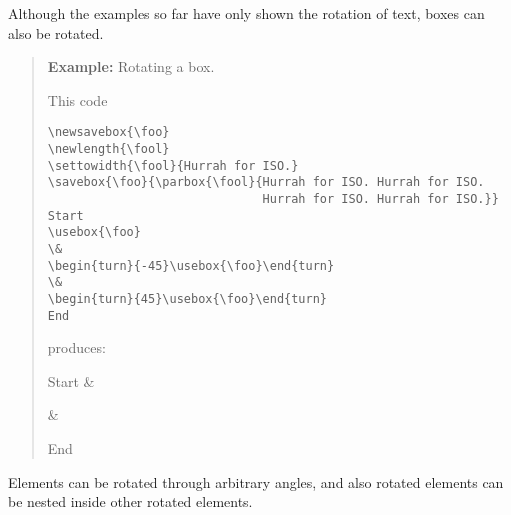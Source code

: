 \documentclass[11pt]{article}
\newenvironment{example}{\begin{quotation}\small\textbf{Example: }}{\par\end{quotation}}
\begin{document}
    Although the examples so far have only shown the rotation of text, boxes
can also be rotated.

\begin{example}Rotating a box.

This code
\begin{verbatim}
\newsavebox{\foo}
\newlength{\fool}
\settowidth{\fool}{Hurrah for ISO.}
\savebox{\foo}{\parbox{\fool}{Hurrah for ISO. Hurrah for ISO.
                              Hurrah for ISO. Hurrah for ISO.}}
Start
\usebox{\foo}
\&
\begin{turn}{-45}\usebox{\foo}\end{turn}
\&
\begin{turn}{45}\usebox{\foo}\end{turn}
End
\end{verbatim}
produces:

\newsavebox{\foo}
\newlength{\fool}
\settowidth{\fool}{Hurrah for ISO.}
Start
\usebox{\foo}
\&
\begin{turn}{-45}\usebox{\foo}\end{turn}
\&
\begin{turn}{45}\usebox{\foo}\end{turn}
End

\end{example} %

    Elements can be rotated through arbitrary angles, and also rotated
elements can be nested inside other rotated elements.
\end{document}
